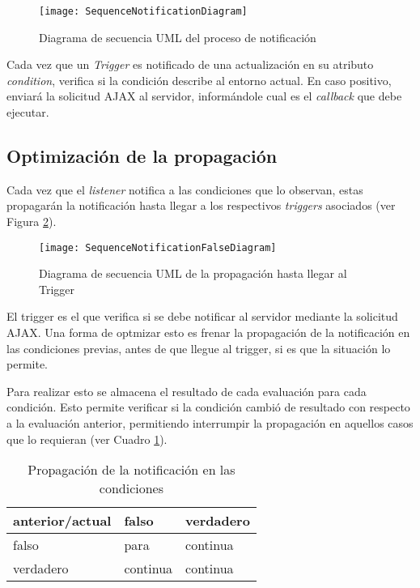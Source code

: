 \begin{figure}[ht!]
\centering
\texttt{[image: SequenceNotificationDiagram]}
\caption{Diagrama de secuencia UML del proceso de notificación}
\label{SequenceNotificationDiagram}
\end{figure}

Cada vez que un \emph{Trigger} es notificado de una actualización en su atributo \emph{condition}, verifica si la condición describe al entorno actual. En caso positivo, enviará la solicitud AJAX al servidor, informándole cual es el \emph{callback} que debe ejecutar.


\subsection{Optimización de la propagación}

Cada vez que el \emph{listener} notifica a las condiciones que lo observan, estas propagarán la notificación hasta llegar a los respectivos \emph{triggers} asociados (ver Figura \ref{SequenceNotificationFalseDiagram}).

\begin{figure}[ht!]
\centering
\texttt{[image: SequenceNotificationFalseDiagram]}
\caption{Diagrama de secuencia UML de la propagación hasta llegar al Trigger}
\label{SequenceNotificationFalseDiagram}
\end{figure}

El trigger es el que verifica si se debe notificar al servidor mediante la solicitud AJAX. Una forma de optmizar esto es frenar la propagación de la notificación en las condiciones previas, antes de que llegue al trigger, si es que la situación lo permite.

Para realizar esto se almacena el resultado de cada evaluación para cada condición. Esto permite verificar si la condición cambió de resultado con respecto a la evaluación anterior, permitiendo interrumpir la propagación en aquellos casos que lo requieran (ver Cuadro \ref{PropagationTable}).

\begin{table}[ht!]
\centering
\begin{tabular}{ | l | l l |}
\hline
anterior/actual & falso & verdadero \\
\hline
falso & para & continua \\
verdadero & continua & continua \\
\hline
\end{tabular}
\caption{Propagación de la notificación en las condiciones}
\label{PropagationTable}
\end{table}

